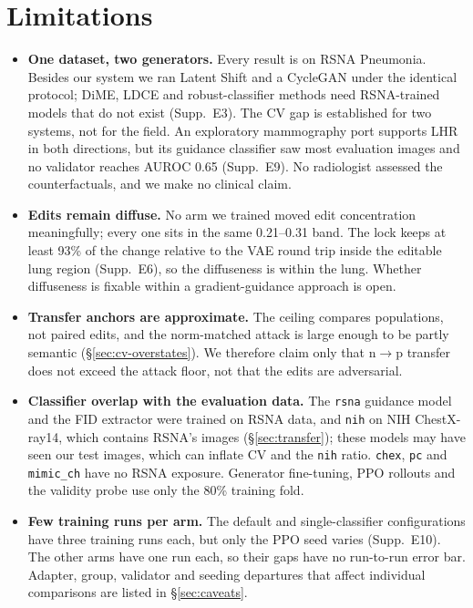 \section{Limitations}
\label{sec:limitations}

\begin{itemize}
    \item \textbf{One dataset, two generators.} Every result is on RSNA Pneumonia. Besides our system we ran Latent Shift and a CycleGAN under the identical protocol; DiME, LDCE and robust-classifier methods need RSNA-trained models that do not exist (Supp.~E3). The CV gap is established for two systems, not for the field. An exploratory mammography port supports LHR in both directions, but its guidance classifier saw most evaluation images and no validator reaches AUROC 0.65 (Supp.~E9). No radiologist assessed the counterfactuals, and we make no clinical claim.
    \item \textbf{Edits remain diffuse.} No arm we trained moved edit concentration meaningfully; every one sits in the same 0.21--0.31 band. The lock keeps at least 93\% of the change relative to the VAE round trip inside the editable lung region (Supp.~E6), so the diffuseness is within the lung. Whether diffuseness is fixable within a gradient-guidance approach is open.
    \item \textbf{Transfer anchors are approximate.} The ceiling compares populations, not paired edits, and the norm-matched attack is large enough to be partly semantic (\S\ref{sec:cv-overstates}). We therefore claim only that n$\to$p transfer does not exceed the attack floor, not that the edits are adversarial.
    \item \textbf{Classifier overlap with the evaluation data.} The \texttt{rsna} guidance model and the FID extractor were trained on RSNA data, and \texttt{nih} on NIH ChestX-ray14, which contains RSNA's images (\S\ref{sec:transfer}); these models may have seen our test images, which can inflate CV and the \texttt{nih} ratio. \texttt{chex}, \texttt{pc} and \texttt{mimic\_ch} have no RSNA exposure. Generator fine-tuning, PPO rollouts and the validity probe use only the 80\% training fold.
    \item \textbf{Few training runs per arm.} The default and single-classifier configurations have three training runs each, but only the PPO seed varies (Supp.~E10). The other arms have one run each, so their gaps have no run-to-run error bar. Adapter, group, validator and seeding departures that affect individual comparisons are listed in \S\ref{sec:caveats}.

\end{itemize}

